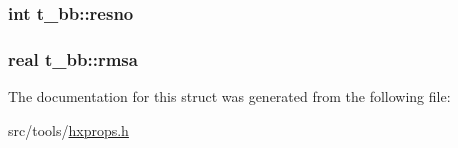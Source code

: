 \hypertarget{structt__bb_abca4d481eed4ccaa0da8b034f14b3e45}{
\subsubsection[{resno}]{\setlength{\rightskip}{0pt plus 5cm}int {\bf t\-\_\-bb\-::resno}}}\label{structt__bb_abca4d481eed4ccaa0da8b034f14b3e45}
\hypertarget{structt__bb_afb93d2d5ca80b84111289b7e22829a23}{
\subsubsection[{rmsa}]{\setlength{\rightskip}{0pt plus 5cm}real {\bf t\-\_\-bb\-::rmsa}}}\label{structt__bb_afb93d2d5ca80b84111289b7e22829a23}


\-The documentation for this struct was generated from the following file\-:\begin{DoxyCompactItemize}
\item 
src/tools/\hyperlink{hxprops_8h}{hxprops.\-h}\end{DoxyCompactItemize}
